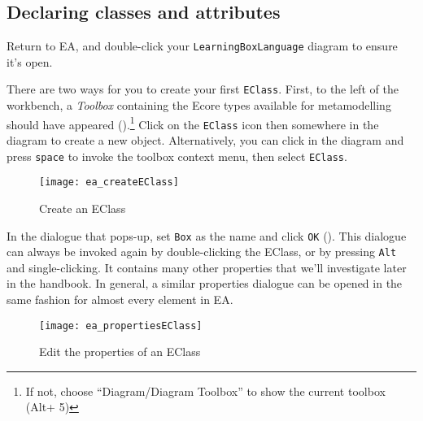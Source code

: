\newpage
\subsection{Declaring classes and attributes}
\genHeader
\hypertarget{static:classes vis}{}

\begin{stepbystep}

\item Return to EA, and double-click your \texttt{LearningBoxLanguage} diagram to ensure it's open.

\vspace{0.5cm}

\item There are two ways for you to create your first \texttt{EClass}. First, to the left of the workbench, a \emph{Toolbox} containing
the Ecore types available for metamodelling should have appeared ().\footnote{If not, choose ``Diagram/Diagram Toolbox'' to show the
current toolbox (Alt+ 5)} Click on the \texttt{EClass} icon then somewhere in the diagram to create a new object. Alternatively, you can click in the diagram and press
\texttt{space} to invoke the toolbox context menu, then select \texttt{EClass}.

\vspace{0.5cm}

\begin{figure}[htbp]
	\centering
  \texttt{[image: ea\_createEClass]}
	\caption{Create an EClass}
	\label{ea:eclass}
\end{figure}

\vspace{0.5cm}

\item In the dialogue that pops-up, set \texttt{Box} as the name and click \texttt{OK} ().
This dialogue can always be invoked again by double-clicking the EClass, or by pressing \texttt{Alt} and single-clicking. It contains many other properties that we'll investigate later in the handbook. In general, a similar properties dialogue can be opened in the same fashion for almost every element in EA.

\clearpage

\begin{figure}[ht]
	\centering
  \texttt{[image: ea\_propertiesEClass]}
	\caption{Edit the properties of an EClass}
	\label{ea:eclass_properties}
\end{figure}


\end{stepbystep}
